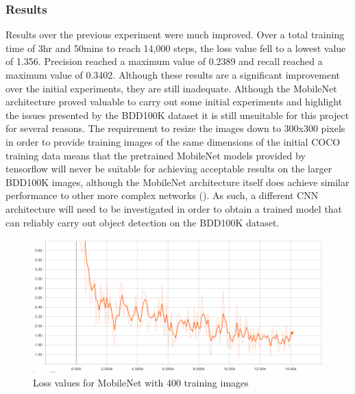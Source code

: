 \documentclass[12pt]{report}
\begin{document}
\subsubsection*{Results}
\begin{flushleft}
Results over the previous experiment were much improved. Over a total training time of 3hr and 50mins to reach 14,000 steps, the loss value fell to a lowest value of 1.356. Precision reached a maximum value of 0.2389 and recall reached a maximum value of 0.3402. Although these results are a significant improvement over the initial experiments, they are still inadequate. Although the MobileNet architecture proved valuable to carry out some initial experiments and highlight the issues presented by the BDD100K dataset it is still unsuitable for this project for several reasons. The requirement to resize the images down to 300x300 pixels in order to provide training images of the same dimensions of the initial COCO training data means that the pretrained MobileNet models provided by tensorflow will never be suitable for achieving acceptable results on the larger BDD100K images, although the MobileNet architecture itself does achieve similar performance to other more complex networks (\cite{howard2017mobilenets}). As such, a different CNN architecture will need to be investigated in order to obtain a trained model that can reliably carry out object detection on the BDD100K dataset.
\end{flushleft}

\vspace{0.5cm}
\begin{figure}[ht!]
	\centering
	\includegraphics[width=15cm]{loss-mobilenet-2}
	\caption{Loss values for MobileNet with 400 training images}
	\label{fig:loss-mobilenet-2}
\end{figure}
\end{document}
